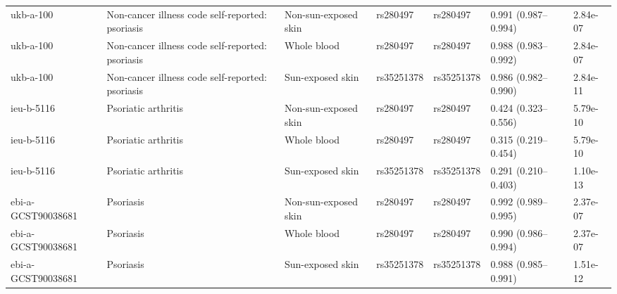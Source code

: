 \documentclass[10pt,a4paper]{article}
\begin{document}
\begin{landscape}
\begin{longtable}{p{3.4cm}p{7.0cm}p{3.4cm}p{2.7cm}p{2.7cm}p{3.7cm}p{2.0cm}}
ukb-a-100 & Non-cancer illness code  self-reported: psoriasis & Non-sun-exposed skin & rs280497 & rs280497 & 0.991 (0.987--0.994) & 2.84e-07 \\
ukb-a-100 & Non-cancer illness code  self-reported: psoriasis & Whole blood & rs280497 & rs280497 & 0.988 (0.983--0.992) & 2.84e-07 \\
ukb-a-100 & Non-cancer illness code  self-reported: psoriasis & Sun-exposed skin & rs35251378 & rs35251378 & 0.986 (0.982--0.990) & 2.84e-11 \\
ieu-b-5116 & Psoriatic arthritis & Non-sun-exposed skin & rs280497 & rs280497 & 0.424 (0.323--0.556) & 5.79e-10 \\
ieu-b-5116 & Psoriatic arthritis & Whole blood & rs280497 & rs280497 & 0.315 (0.219--0.454) & 5.79e-10 \\
ieu-b-5116 & Psoriatic arthritis & Sun-exposed skin & rs35251378 & rs35251378 & 0.291 (0.210--0.403) & 1.10e-13 \\
ebi-a-GCST90038681 & Psoriasis & Non-sun-exposed skin & rs280497 & rs280497 & 0.992 (0.989--0.995) & 2.37e-07 \\
ebi-a-GCST90038681 & Psoriasis & Whole blood & rs280497 & rs280497 & 0.990 (0.986--0.994) & 2.37e-07 \\
ebi-a-GCST90038681 & Psoriasis & Sun-exposed skin & rs35251378 & rs35251378 & 0.988 (0.985--0.991) & 1.51e-12 \\
\end{longtable}
\end{landscape}
\end{document}
